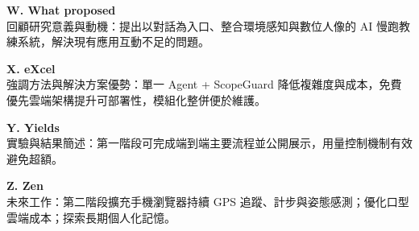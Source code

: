 \documentclass[12pt,a4paper]{article}
\begin{document}
\textbf{W. What proposed} \\
回顧研究意義與動機：提出以對話為入口、整合環境感知與數位人像的 AI 慢跑教練系統，解決現有應用互動不足的問題。

\textbf{X. eXcel} \\
強調方法與解決方案優勢：單一 Agent + ScopeGuard 降低複雜度與成本，免費優先雲端架構提升可部署性，模組化整併便於維護。

\textbf{Y. Yields} \\
實驗與結果簡述：第一階段可完成端到端主要流程並公開展示，用量控制機制有效避免超額。

\textbf{Z. Zen} \\
未來工作：第二階段擴充手機瀏覽器持續 GPS 追蹤、計步與姿態感測；優化口型雲端成本；探索長期個人化記憶。
\end{document}
